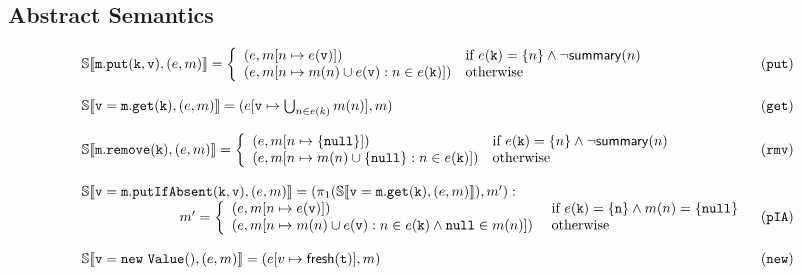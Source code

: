 \subsection{Abstract Semantics}
\label{sect:abstractsemantics}

\begin{figure*}
\[
\begin{array}{ll}
\mathbb{S}\llbracket \mathtt{m.put(k, v)}, (e, m) \rrbracket = \left\{
\begin{array}{ll}
(e, m[n \mapsto e(\mathtt{v})]) & \textrm{if } e(\mathtt{k})=\{n\} \land \neg \mathsf{summary}(n)\\
(e, m[n \mapsto m(n) \cup e(\mathtt{v}) : n \in e(\mathtt{k})]) & \textrm{otherwise}\\
\end{array}
\right. & (\mathtt{put})\\
\\
\mathbb{S}\llbracket \mathtt{v=m.get(k)}, (e, m) \rrbracket = (e[\mathtt{v} \mapsto \bigcup_{n \in e(k)} m(n)], m) & (\mathtt{get})\\
\\
\mathbb{S}\llbracket \mathtt{m.remove(k)}, (e, m) \rrbracket =  \left\{
\begin{array}{ll}
(e, m[n \mapsto \{\mathtt{null}\}]) & \textrm{if } e(\mathtt{k})=\{n\} \land \neg \mathsf{summary}(n)\\
(e, m[n \mapsto m(n) \cup \{\mathtt{null}\} : n \in e(\mathtt{k})]) & \textrm{otherwise}\\
\end{array}
\right. & (\mathtt{rmv})\\ 
\\
\mathbb{S}\llbracket \mathtt{v = m.putIfAbsent(k, v)}, (e, m) \rrbracket =  (\pi_1(\mathbb{S}\llbracket \mathtt{v = m.get(k)}, (e, m) \rrbracket), m') : & \\
\hspace{70pt} 
m'=
\left\{
\begin{array}{ll}
(e, m[n \mapsto e(\mathtt{v})]) & \textrm{ if } e(\mathtt{k})=\{\mathtt{n}\} \land m(n) = \{\mathtt{null}\}\\
(e, m[n \mapsto m(n) \cup e(\mathtt{v}) : n \in e(\mathtt{k}) \land \mathtt{null} \in m(n)]) & \textrm{ otherwise}\\
\end{array}
\right. & (\mathtt{pIA})\\
\\
\mathbb{S}\llbracket \mathtt{v = new\ Value()}, (e, m) \rrbracket =  (e[v \mapsto \mathsf{fresh}(\mathtt{t})], m)& (\mathtt{new})\\

\end{array}\]
\end{figure*}
